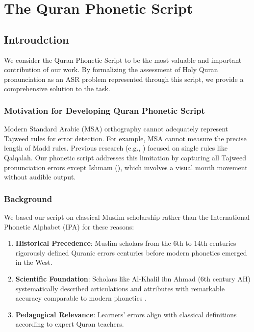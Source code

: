
\chapter{The Quran Phonetic Script} %

\label{Chapter3} %



\section{Introudction}



We consider the Quran Phonetic Script to be the most valuable and important contribution of our work. By formalizing the assessment of Holy Quran pronunciation as an ASR problem represented through this script, we provide a comprehensive solution to the task.

\subsection{Motivation for Developing Quran Phonetic Script}

Modern Standard Arabic (MSA) orthography cannot adequately represent Tajweed rules for error detection. For example, MSA cannot measure the precise length of Madd rules. Previous research (e.g., \cite{omran2023automatic}) focused on single rules like Qalqalah. Our phonetic script addresses this limitation by capturing all Tajweed pronunciation errors except Ishmam (), which involves a visual mouth movement without audible output.

\subsection{Background}

We based our script on classical Muslim scholarship rather than the International Phonetic Alphabet (IPA) for these reasons:

\begin{enumerate}
    \item \textbf{Historical Precedence}: Muslim scholars from the 6th to 14th centuries rigorously defined Quranic errors centuries before modern phonetics emerged in the West.
    \item \textbf{Scientific Foundation}: Scholars like Al-Khalil ibn Ahmad (6th century AH) systematically described articulations and attributes with remarkable accuracy comparable to modern phonetics \cite{article-khalil}.
    \item \textbf{Pedagogical Relevance}: Learners' errors align with classical definitions according to expert Quran teachers.
\end{enumerate}

